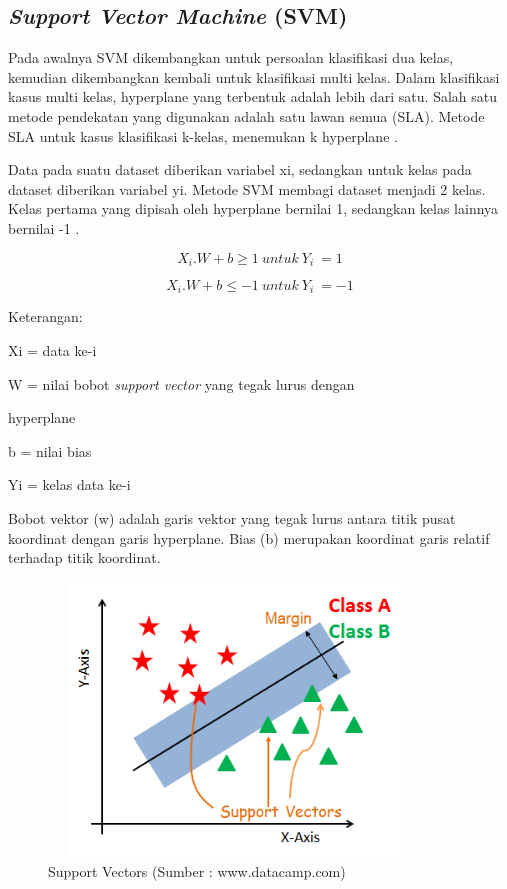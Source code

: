\subsection{\textit{Support Vector Machine} (SVM)}
Pada awalnya SVM dikembangkan untuk persoalan klasifikasi dua kelas, kemudian dikembangkan kembali untuk klasifikasi multi kelas. Dalam klasifikasi kasus multi kelas, hyperplane yang terbentuk adalah lebih dari satu. Salah satu metode pendekatan yang digunakan adalah satu lawan semua (SLA). Metode SLA untuk kasus klasifikasi k-kelas, menemukan k hyperplane \citep{Braun2011}.

Data pada suatu dataset diberikan variabel xi, sedangkan untuk kelas pada dataset diberikan variabel yi. Metode SVM membagi dataset menjadi 2 kelas. Kelas pertama yang dipisah
oleh hyperplane bernilai 1, sedangkan kelas lainnya bernilai -1 \citep{Santos2021}.

\begin{equation}
	X_i.W + b \ge 1 \> untuk \> Y_i\>=1
\end{equation}

\begin{equation}
	X_i.W + b \le  -1 \> untuk \> Y_i\>=-1
\end{equation}

\par Keterangan:
\par Xi = data ke-i
\par W = nilai bobot \textit{support vector} yang tegak lurus dengan \par hyperplane
\par b = nilai bias
\par Yi = kelas data ke-i

\par Bobot vektor (w) adalah garis vektor yang tegak lurus antara titik pusat koordinat dengan garis hyperplane. Bias (b) merupakan koordinat garis relatif terhadap titik koordinat.


\begin{figure}[H]
	\centering
	\includegraphics[width=10cm, height=7.3cm]{gambar/index3_souoaz}
	\caption{Support Vectors (Sumber : www.datacamp.com)}
	\label{index3_souoaz}
\end{figure}

